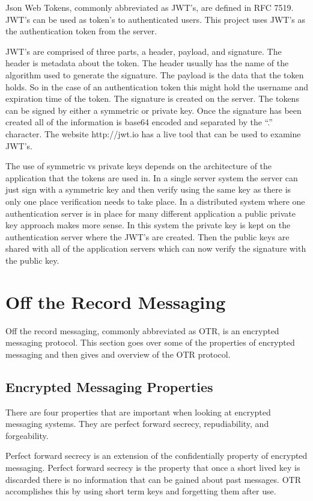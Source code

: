 Json Web Tokens, commonly abbreviated as JWT’s, are defined in RFC 7519. \cite{jwt-frc} JWT’s can be used as token’s to authenticated users. This project uses JWT’s as the authentication token from the server.


JWT’s are comprised of three parts, a header, payload, and signature. The header is metadata about the token. The header usually has the name of the algorithm used to generate the signature. The payload is the data that the token holds. So in the case of an authentication token this might hold the username and expiration time of the token. The signature is created on the server. The tokens can be signed by either a symmetric or private key. Once the signature has been created all of the information is base64 encoded and separated by the “.” character. The website http://jwt.io has a live tool that can be used to examine JWT’s. 


The use of symmetric vs private keys depends on the architecture of the application that the tokens are used in. In a single server system the server can just sign with a symmetric key and then verify using the same key as there is only one place verification needs to take place. In a distributed system where one authentication server is in place for many different application a public private key approach makes more sense. In this system the private key is kept on the authentication server where the JWT’s are created. Then the public keys are shared with all of the application servers which can now verify the signature with the public key.


\section{Off the Record Messaging}


Off the record messaging, commonly abbreviated as OTR, is an encrypted messaging protocol. This section goes over some of the properties of encrypted messaging and then gives and overview of the OTR protocol.


\subsection{Encrypted Messaging Properties}


There are four properties that are important when looking at encrypted messaging systems. They are perfect forward secrecy, repudiability, and forgeability.


Perfect forward secrecy is an extension of the confidentially property of encrypted messaging. Perfect forward secrecy is the property that once a short lived key is discarded there is no information that can be gained about past messages. OTR accomplishes this by using short term keys and forgetting them after use. 


